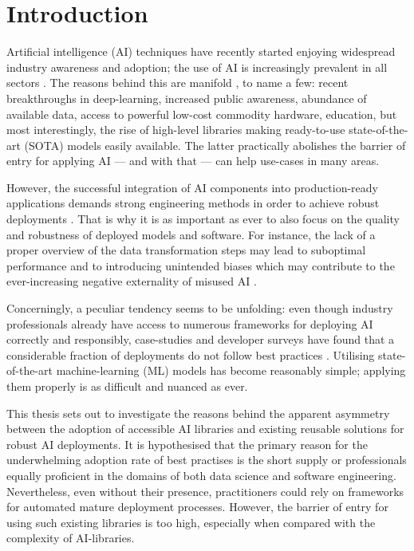 \chapter{Introduction}

Artificial intelligence (AI) techniques have recently started enjoying widespread industry awareness and adoption; the use of AI is increasingly prevalent in all sectors \cite{wirtz2019artificial,bosch2021engineering}. The reasons behind this are manifold \cite{jordan2015machine}, to name a few: recent breakthroughs in deep-learning, increased public awareness, abundance of available data, access to powerful low-cost commodity hardware, education, but most interestingly, the rise of high-level libraries making ready-to-use state-of-the-art (SOTA) models easily available. The latter practically abolishes the barrier of entry for applying AI --- and with that --- can help use-cases in many areas. 

However, the successful integration of AI components into production-ready applications demands strong engineering methods in order to achieve robust deployments \cite{serban2020adoption}. That is why it is as important as ever to also focus on the quality and robustness of deployed models and software. For instance, the lack of a proper overview of the data transformation steps may lead to suboptimal performance and to introducing unintended biases which may contribute to the ever-increasing negative externality of misused AI \cite{o2016weapons}.

Concerningly, a peculiar tendency seems to be unfolding: even though industry professionals already have access to numerous frameworks for deploying AI correctly and responsibly, case-studies and developer surveys have found that a considerable fraction of deployments do not follow best practices \cite{serban2020adoption,haakman2021ai,amershi2019software,de2019understanding,sculley2015hidden}. Utilising state-of-the-art machine-learning (ML) models has become reasonably simple; applying them properly is as difficult and nuanced as ever. 

This thesis sets out to investigate the reasons behind the apparent asymmetry between the adoption of accessible AI libraries and existing reusable solutions for robust AI deployments. It is hypothesised that the primary reason for the underwhelming adoption rate of best practises is the short supply or professionals equally proficient in the domains of both data science and software engineering. Nevertheless, even without their presence, practitioners could rely on frameworks for automated mature deployment processes. However, the barrier of entry for using such existing libraries is too high, especially when compared with the complexity of AI-libraries.

